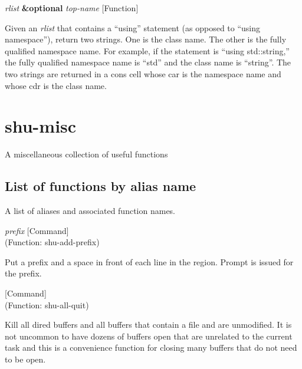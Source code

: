 \vspace{1em}
\noindent
{}
\usebox{\funcname}\emph{rlist} \textbf{\&optional} \emph{top-name}
 \hfill [Function]

\begin{doc-string}
Given an \emph{rlist} that contains a ``using'' statement (as opposed to ``using
namespace''), return two strings.  One is the class name.  The other is the
fully qualified namespace name.  For example, if the statement is ``using
std::string,'' the fully qualified namespace name is ``std'' and the class name
is ``string''.
The two strings are returned in a cons cell whose car is the namespace name and
whose cdr is the class name.
\end{doc-string}

\eject
\section{shu-misc}



A miscellaneous collection of useful functions


\subsection{List of functions by alias name}

A list of aliases and associated function names.



\vspace{1em}
\noindent
{}
\usebox{\funcname}\emph{prefix}
 \hfill [Command]\\%
 (Function: shu-add-prefix)

\begin{doc-string}
Put a prefix and a space in front of each line in the region.  Prompt is issued
for the prefix.
\end{doc-string}

\vspace{1em}
\noindent
{}
\usebox{\funcname}
 \hfill [Command]\\%
 (Function: shu-all-quit)

\begin{doc-string}
Kill all dired buffers and all buffers that contain a file and are unmodified.
It is not uncommon to have dozens of buffers open that are unrelated to the current task
and this is a convenience function for closing many buffers that do not need to
be open.
\end{doc-string}

